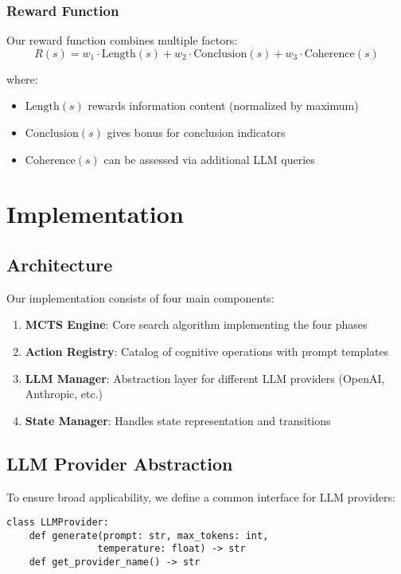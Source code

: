\documentclass[conference]{IEEEtran}
\begin{document}
\subsubsection{Reward Function}

Our reward function combines multiple factors:
\begin{equation}
R(s) = w_1 \cdot \text{Length}(s) + w_2 \cdot \text{Conclusion}(s) + w_3 \cdot \text{Coherence}(s)
\end{equation}

where:
\begin{itemize}
\item $\text{Length}(s)$ rewards information content (normalized by maximum)
\item $\text{Conclusion}(s)$ gives bonus for conclusion indicators  
\item $\text{Coherence}(s)$ can be assessed via additional LLM queries
\end{itemize}

\section{Implementation}

\subsection{Architecture}

Our implementation consists of four main components:

\begin{enumerate}
\item \textbf{MCTS Engine}: Core search algorithm implementing the four phases
\item \textbf{Action Registry}: Catalog of cognitive operations with prompt templates
\item \textbf{LLM Manager}: Abstraction layer for different LLM providers (OpenAI, Anthropic, etc.)
\item \textbf{State Manager}: Handles state representation and transitions
\end{enumerate}

\subsection{LLM Provider Abstraction}

To ensure broad applicability, we define a common interface for LLM providers:

\begin{verbatim}
class LLMProvider:
    def generate(prompt: str, max_tokens: int, 
                temperature: float) -> str
    def get_provider_name() -> str
\end{verbatim}
\end{document}
